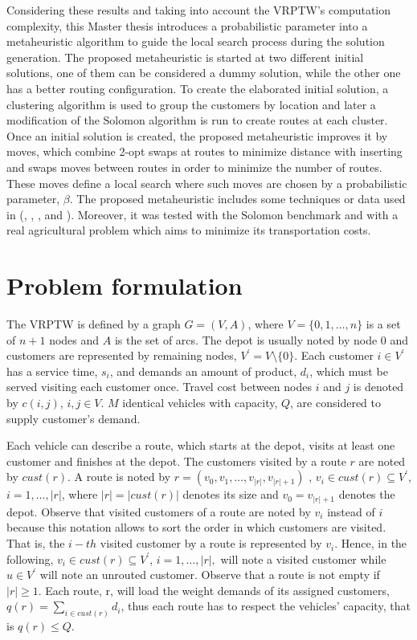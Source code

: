 Considering these results and taking into account the VRPTW's computation complexity, this Master thesis introduces a probabilistic parameter into a metaheuristic algorithm to guide the local search process during the solution generation. The proposed metaheuristic is started at two different initial solutions, one of them can be considered a dummy solution, while the other one has a better routing configuration. To create the elaborated initial solution, a clustering algorithm is used to group the customers by location and later a modification of the Solomon algorithm \cite{Solomon_1987} is run to create routes at each cluster. Once an initial solution is created, the proposed metaheuristic improves it by moves, which combine 2-opt swaps at routes to minimize distance with inserting and swaps moves between routes in order to minimize the number of routes. These moves define a local search where such moves are chosen by a probabilistic parameter, $\beta.$ The proposed metaheuristic includes some techniques or data used in (\cite{Balbina}, \cite{Helsgaun}, \cite{Juan}, \cite{L-K} and \cite{Solomon_1987}). Moreover, it was tested with the Solomon benchmark and with a real agricultural problem which aims to minimize its transportation costs. 


\section{Problem formulation}\label{problem_formulation}
The VRPTW is defined by a graph $G=( V, A)$, where $V=\{0,1,\dots,n\}$ is a set of $n+1$ nodes and $A$ is the set of arcs. The depot is usually noted by node $0$ and customers are represented by remaining nodes, $V^{'} = V \setminus \{0\}$. Each customer $i \in V^{'}$ has a service time, $s_{i}$, and demands an amount of product, $d_{i}$, which must be served visiting each customer once. Travel cost between nodes $i$ and $j$ is denoted by $c(i,j)$, $i,j \in V $. $M$ identical vehicles with capacity, $Q$, are considered to supply customer's demand.

Each vehicle can describe a route, which starts at the depot, visits at least one customer and finishes at the depot. The customers visited by a route $r$ are noted by $cust(r)$. A route is noted by $r=(v_{0},v_{1},\dots,v_{|r|},v_{|r|+1})$ , $ v_{i} \in cust(r) \subseteq V^{'} $, $i = 1, \dots, |r|$, where $|r| = |cust(r)|$ denotes its size and $v_{0} = v_{|r|+1}$ denotes the depot. Observe that visited customers of a route are noted by $v_i$ instead of $i$ because this notation allows to sort the order in which customers are visited. That is, the $i-th$ visited customer by a route is represented by $v_i$. Hence, in the following, $v_i \in cust(r) \subseteq  V^{'}$, $i = 1, \dots, |r|,$ will note a visited customer while $u \in V^{'}$ will note an unrouted customer. Observe that a route is not empty if $|r|\geq 1$. Each route, r, will load the weight demands of its assigned customers, $q(r) = \sum_{i \in cust(r)} d_{i}$, thus each route has to respect the vehicles' capacity, that is $q(r) \leq Q$.

